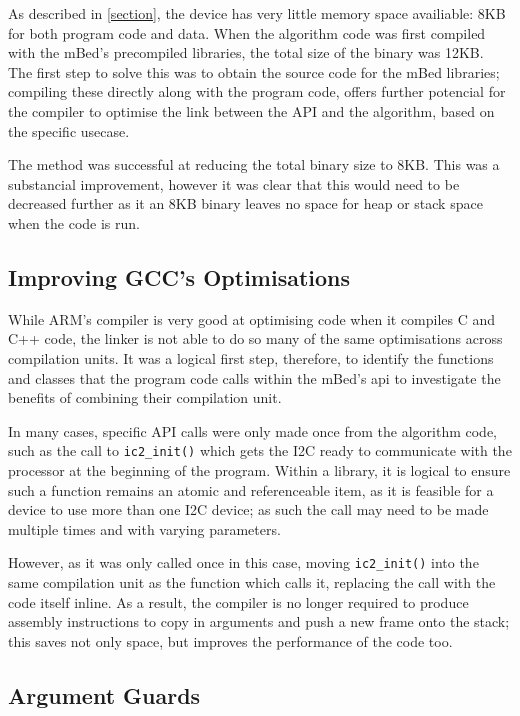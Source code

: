 
As described in \ref{section}, the device has very little memory space availiable: 8KB for both program code and data. When the algorithm code was first compiled with the mBed's precompiled libraries, the total size of the binary was 12KB. The first step to solve this was to obtain the source code for the mBed libraries; compiling these directly along with the program code, offers further potencial for the compiler to optimise the link between the API and the algorithm, based on the specific usecase.

The method was successful at reducing the total binary size to 8KB. This was a substancial improvement, however it was clear that this would need to be decreased further as it an 8KB binary leaves no space for heap or stack space when the code is run.

\subsection{Improving GCC's Optimisations}

While ARM's compiler is very good at optimising code when it compiles C and C++ code, the linker is not able to do so many of the same optimisations across compilation units. It was a logical first step, therefore, to identify the functions and classes that the program code calls within the mBed's api to investigate the benefits of combining their compilation unit.

In many cases, specific API calls were only made once from the algorithm code, such as the call to \verb|ic2_init()| which gets the I2C ready to communicate with the processor at the beginning of the program. Within a library, it is logical to ensure such a function remains an atomic and referenceable item, as it is feasible for a device to use more than one I2C device; as such the call may need to be made multiple times and with varying parameters.

However, as it was only called once in this case, moving \verb|ic2_init()| into the same compilation unit as the function which calls it, replacing the call with the code itself inline. As a result, the compiler is no longer required to produce assembly instructions to copy in arguments and push a new frame onto the stack; this saves not only space, but improves the performance of the code too.

\subsection{Argument Guards}

